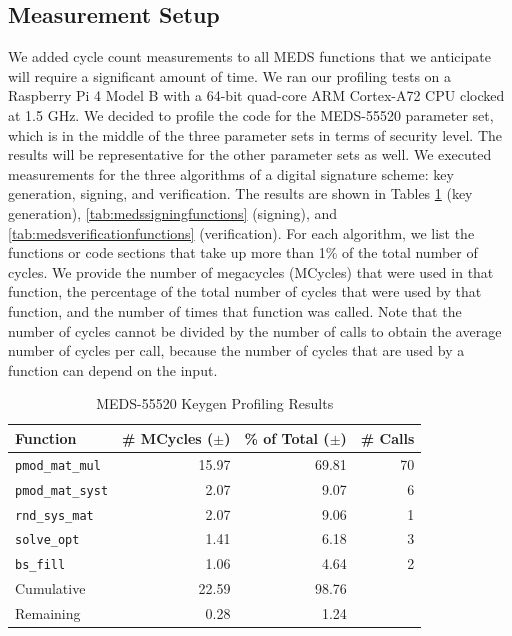 \documentclass[11pt,a4paper]{report}
\theoremstyle{definition}
\begin{document}
\subsection{Measurement Setup}
We added cycle count measurements to all MEDS functions that we anticipate will require a significant amount of time. We ran our profiling tests on a Raspberry Pi 4 Model B with a 64-bit quad-core ARM Cortex-A72 CPU clocked at 1.5 GHz. We decided to profile the code for the MEDS-55520 parameter set, which is in the middle of the three parameter sets in terms of security level. The results will be representative for the other parameter sets as well. We executed measurements for the three algorithms of a digital signature scheme: key generation, signing, and verification. The results are shown in Tables \ref{tab:medskeygenfunctions} (key generation), \ref{tab:medssigningfunctions} (signing), and \ref{tab:medsverificationfunctions} (verification). For each algorithm, we list the functions or code sections that take up more than 1\% of the total number of cycles. We provide the number of megacycles (MCycles) that were used in that function, the percentage of the total number of cycles that were used by that function, and the number of times that function was called. Note that the number of cycles cannot be divided by the number of calls to obtain the average number of cycles per call, because the number of cycles that are used by a function can depend on the input.

\begin{table}[]
  \centering
  \begin{tabular}{lrrr}
    \toprule
    \textbf{Function} & \textbf{\# MCycles} ($\pm$) & \textbf{\% of Total} ($\pm$) & \textbf{\# Calls} \\
    \midrule
      \texttt{pmod\_mat\_mul} & 15.97 & 69.81 & 70 \\
      \texttt{pmod\_mat\_syst} & 2.07 & 9.07 & 6 \\
      \texttt{rnd\_sys\_mat} & 2.07 & 9.06 & 1 \\
      \texttt{solve\_opt} & 1.41 & 6.18 & 3 \\
      \texttt{bs\_fill} & 1.06 & 4.64 & 2 \\
    \midrule
      Cumulative & 22.59 & 98.76 & \\
      Remaining & 0.28 & 1.24 & \\
    \bottomrule
  \end{tabular}
  \caption{MEDS-55520 Keygen Profiling Results}
  \label{tab:medskeygenfunctions}
\end{table}
\end{document}
